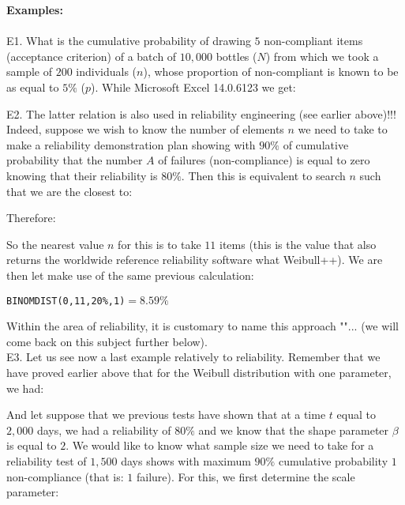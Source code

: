 	\begin{tcolorbox}[colframe=black,colback=white,sharp corners]
	\textbf{{\Large {}}Examples:}\\\\
	E1. What is the cumulative probability of drawing $5$ non-compliant items (acceptance criterion) of a batch of $10,000$ bottles ($N$) from which we took a sample of $200$ individuals ($n$), whose proportion of non-compliant is known to be as equal to $5\%$ ($p$). While  Microsoft Excel 14.0.6123 we get:
	
	E2. The latter relation is also used in reliability engineering (see earlier above)!!! Indeed, suppose we wish to know the number of elements $n$ we need to take to make a reliability demonstration plan showing with $90\%$ of cumulative probability that the number $A$ of failures  (non-compliance) is equal to zero knowing that their reliability is $80\%$. Then this is equivalent to search $n$ such that we are the closest to:
	
	Therefore:
	
	So the nearest value $n$ for this is to take $11$ items (this is the value that also returns the worldwide reference reliability software what Weibull++). We are then let make use of the same previous calculation:
	\begin{center}
		\texttt{BINOMDIST(0,11,20\%,1)}$=8.59\%$
	\end{center}
	Within the area of reliability, it is customary to name this approach ""... (we will come back on this subject further below).\\
	
	E3. Let us see now a last example relatively to reliability. Remember that we have proved earlier above that for the Weibull distribution with one parameter, we had:
	
	And let suppose that we previous tests have shown that at a time $t$ equal to $2,000$ days, we had a reliability of $80\%$ and we know that the shape parameter $\beta$is equal to $2$. We would like to know what sample size we need to take for a reliability test of $1,500$ days shows with maximum $90\%$ cumulative probability $1$ non-compliance (that is: $1$ failure). For this, we first determine the scale parameter:
	\end{tcolorbox}
	
